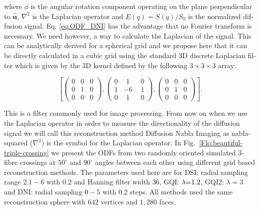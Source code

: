 \documentclass{bioinfo}
\begin{document}
\noindent where $\phi$ is the angular rotation component operating
on the plane perpendicular to $\hat{\mathbf{u}}$, \foreignlanguage{english}{$\nabla^{2}$
is the Laplacian operator and $E(q)=S(q)/S_{0}$ is the normalized
diffusion signal. Eq. \ref{eq:ODF_DNI} has the advantage that no
Fourier transform is necessary. We need however, a way to calculate
the Laplacian of the signal. This can be analytically derived for
a spherical grid \citep{aganj2010reconstruction} and we propose here
that it can be directly calculated in a cubic grid using the standard
3D discrete Laplacian filter which is given by the 3D kernel defined
by the following $3\times3\times3$ array: }

%
\[
\left[\left(\begin{array}{ccc}
0 & 0 & 0\\
0 & 1 & 0\\
0 & 0 & 0\end{array}\right),\left(\begin{array}{ccc}
0 & \:\,1 & \:\,0\\
1 & -6 & \:\,1\\
0 & \:\,1 & \:\,0\end{array}\right),\left(\begin{array}{ccc}
0 & 0 & 0\\
0 & 1 & 0\\
0 & 0 & 0\end{array}\right)\right].\]


\noindent This is a filter commonly used for image processing. From
now on when we use the Laplacian operator in order to measure the
directionality of the diffusion signal we will call this reconstruction
method Diffusion Nabla Imaging as nabla-squared ($\nabla^{2}$) is
the symbol for the Laplacian operator. In Fig.~\ref{Flo:beautiful-triple-crossing}
we present the ODFs from two randomly oriented simulated $3$-fibre
crossings at $50^{\circ}$ and $90^{\circ}$ angles between each other
using different grid based reconstruction methods. The parameters
used here are for DSI: radial sampling range $2.1-6$ with $0.2$
and Hanning filter width $36$, GQI: $\text{\ensuremath{\lambda}=1.2}$,
GQI2: $\lambda=3$ and DNI: radial sampling $0-5$ with $0.2$ steps.
All methods used the same reconstruction sphere with $642$ vertices
and $1,280$ faces. 
\end{document}
